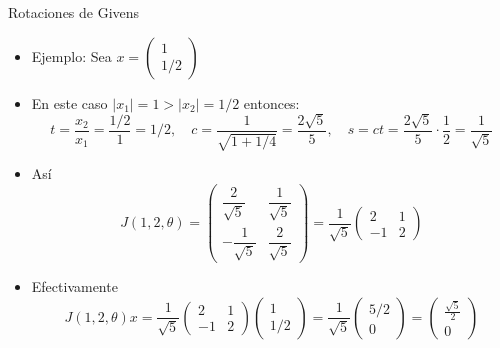 \documentclass{beamer}
\begin{document}
\begin{frame}{Rotaciones de Givens} 
  \begin{itemize}
   \item<1->Ejemplo: Sea $x=\left(\begin{array}{c}
    1\\
    1/2
   \end{array}\right)$
   \item<2->En este caso $|x_1|=1 > |x_2|=1/2$ entonces:
   \small{
   $$
   t=\dfrac{x_2}{x_1}=\dfrac{1/2}{1}=1/2, \quad c=\dfrac{1}{\sqrt{1+1/4}}=\dfrac{2\sqrt{5}}{5}, \quad s=ct=\dfrac{2\sqrt{5}}{5}\cdot\dfrac{1}{2}=\dfrac{1}{\sqrt{5}}
   $$}
   \item<3->As\'i
$$
J(1,2,\theta) = \left(\begin{array}{cc}
                       \dfrac{2}{\sqrt{5}} & \dfrac{1}{\sqrt{5}}\\
		      -\dfrac{1}{\sqrt{5}} & \dfrac{2}{\sqrt{5}}
                      \end{array}\right)=\dfrac{1}{\sqrt{5}}\left(\begin{array}{cc}
                       2 & 1\\
		      -1 & 2
                      \end{array}\right)
$$
\item<4-> Efectivamente
$$
J(1,2,\theta)x = \frac{1}{\sqrt{5}}\left(\begin{array}{cc}
                       2 & 1\\
		      -1 & 2
                      \end{array}\right)\left(\begin{array}{c}
                       1\\
		      1/2
                      \end{array}\right)=\frac{1}{\sqrt{5}}\left(\begin{array}{c}
                       5/2\\
		      0
                      \end{array}\right)=\left(\begin{array}{c}
                       \frac{\sqrt{5}}{2}\\
		      0
                      \end{array}\right)
$$
\end{itemize}
\end{frame}
\end{document}
